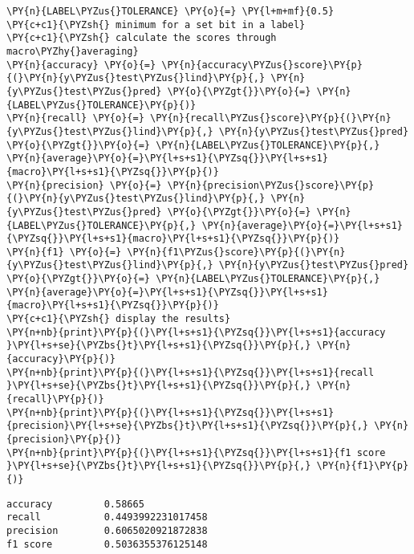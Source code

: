     \begin{tcolorbox}[breakable, size=fbox, boxrule=1pt, pad at break*=1mm,colback=cellbackground, colframe=cellborder]
\begin{Verbatim}[commandchars=\\\{\}]
\PY{n}{LABEL\PYZus{}TOLERANCE} \PY{o}{=} \PY{l+m+mf}{0.5}                                       \PY{c+c1}{\PYZsh{} minimum for a set bit in a label}
\PY{c+c1}{\PYZsh{} calculate the scores through macro\PYZhy{}averaging}
\PY{n}{accuracy} \PY{o}{=} \PY{n}{accuracy\PYZus{}score}\PY{p}{(}\PY{n}{y\PYZus{}test\PYZus{}lind}\PY{p}{,} \PY{n}{y\PYZus{}test\PYZus{}pred} \PY{o}{\PYZgt{}}\PY{o}{=} \PY{n}{LABEL\PYZus{}TOLERANCE}\PY{p}{)}
\PY{n}{recall} \PY{o}{=} \PY{n}{recall\PYZus{}score}\PY{p}{(}\PY{n}{y\PYZus{}test\PYZus{}lind}\PY{p}{,} \PY{n}{y\PYZus{}test\PYZus{}pred} \PY{o}{\PYZgt{}}\PY{o}{=} \PY{n}{LABEL\PYZus{}TOLERANCE}\PY{p}{,} \PY{n}{average}\PY{o}{=}\PY{l+s+s1}{\PYZsq{}}\PY{l+s+s1}{macro}\PY{l+s+s1}{\PYZsq{}}\PY{p}{)}
\PY{n}{precision} \PY{o}{=} \PY{n}{precision\PYZus{}score}\PY{p}{(}\PY{n}{y\PYZus{}test\PYZus{}lind}\PY{p}{,} \PY{n}{y\PYZus{}test\PYZus{}pred} \PY{o}{\PYZgt{}}\PY{o}{=} \PY{n}{LABEL\PYZus{}TOLERANCE}\PY{p}{,} \PY{n}{average}\PY{o}{=}\PY{l+s+s1}{\PYZsq{}}\PY{l+s+s1}{macro}\PY{l+s+s1}{\PYZsq{}}\PY{p}{)}
\PY{n}{f1} \PY{o}{=} \PY{n}{f1\PYZus{}score}\PY{p}{(}\PY{n}{y\PYZus{}test\PYZus{}lind}\PY{p}{,} \PY{n}{y\PYZus{}test\PYZus{}pred} \PY{o}{\PYZgt{}}\PY{o}{=} \PY{n}{LABEL\PYZus{}TOLERANCE}\PY{p}{,} \PY{n}{average}\PY{o}{=}\PY{l+s+s1}{\PYZsq{}}\PY{l+s+s1}{macro}\PY{l+s+s1}{\PYZsq{}}\PY{p}{)}
\PY{c+c1}{\PYZsh{} display the results}
\PY{n+nb}{print}\PY{p}{(}\PY{l+s+s1}{\PYZsq{}}\PY{l+s+s1}{accuracy }\PY{l+s+se}{\PYZbs{}t}\PY{l+s+s1}{\PYZsq{}}\PY{p}{,} \PY{n}{accuracy}\PY{p}{)}
\PY{n+nb}{print}\PY{p}{(}\PY{l+s+s1}{\PYZsq{}}\PY{l+s+s1}{recall   }\PY{l+s+se}{\PYZbs{}t}\PY{l+s+s1}{\PYZsq{}}\PY{p}{,} \PY{n}{recall}\PY{p}{)}
\PY{n+nb}{print}\PY{p}{(}\PY{l+s+s1}{\PYZsq{}}\PY{l+s+s1}{precision}\PY{l+s+se}{\PYZbs{}t}\PY{l+s+s1}{\PYZsq{}}\PY{p}{,} \PY{n}{precision}\PY{p}{)}
\PY{n+nb}{print}\PY{p}{(}\PY{l+s+s1}{\PYZsq{}}\PY{l+s+s1}{f1 score }\PY{l+s+se}{\PYZbs{}t}\PY{l+s+s1}{\PYZsq{}}\PY{p}{,} \PY{n}{f1}\PY{p}{)}
\end{Verbatim}
\end{tcolorbox}

    \begin{Verbatim}[commandchars=\\\{\}]
accuracy         0.58665
recall           0.4493992231017458
precision        0.6065020921872838
f1 score         0.5036355376125148
    \end{Verbatim}

